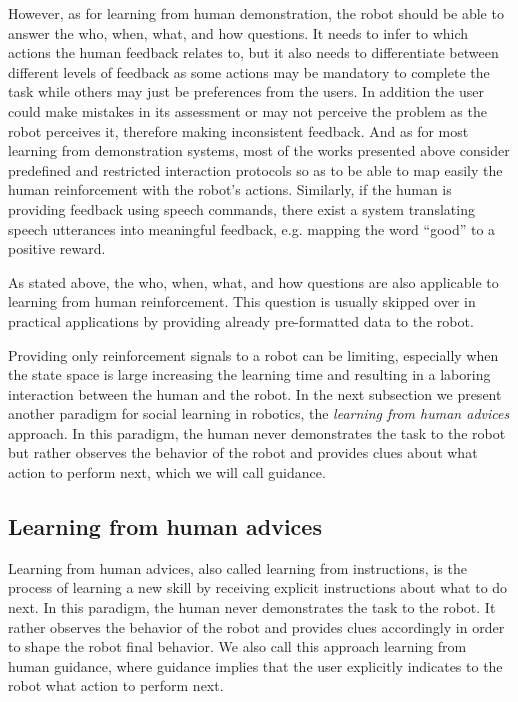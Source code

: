 However, as for learning from human demonstration, the robot should be able to answer the who, when, what, and how questions. It needs to infer to which actions the human feedback relates to, but it also needs to differentiate between different levels of feedback as some actions may be mandatory to complete the task while others may just be preferences from the users. In addition the user could make mistakes in its assessment or may not perceive the problem as the robot perceives it, therefore making inconsistent feedback. And as for most learning from demonstration systems, most of the works presented above consider predefined and restricted interaction protocols so as to be able to map easily the human reinforcement with the robot's actions. Similarly, if the human is providing feedback using speech commands, there exist a system translating speech utterances into meaningful feedback, e.g. mapping the word ``good'' to a positive reward.

\transition

As stated above, the who, when, what, and how questions are also applicable to learning from human reinforcement. This question is usually skipped over in practical applications by providing already pre-formatted data to the robot.

Providing only reinforcement signals to a robot can be limiting, especially when the state space is large increasing the learning time and resulting in a laboring interaction between the human and the robot. In the next subsection we present another paradigm for social learning in robotics, the \emph{learning from human advices} approach. In this paradigm, the human never demonstrates the task to the robot but rather observes the behavior of the robot and provides clues about what action to perform next, which we will call guidance.

\subsection{Learning from human advices}

Learning from human advices, also called learning from instructions, is the process of learning a new skill by receiving explicit instructions about what to do next. In this paradigm, the human never demonstrates the task to the robot. It rather observes the behavior of the robot and provides clues accordingly in order to shape the robot final behavior. We also call this approach learning from human guidance, where guidance implies that the user explicitly indicates to the robot what action to perform next.

